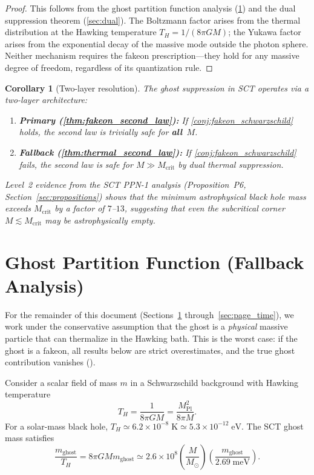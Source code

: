\documentclass[11pt,a4paper]{article}
\newcommand{\MPl}{M_{\mathrm{Pl}}}
\newcommand{\Msun}{M_{\odot}}
\newcommand{\Mcrit}{M_{\mathrm{crit}}}
\newcommand{\mghost}{m_{\mathrm{ghost}}}
\newcommand{\Thr}{T_{\!\scriptscriptstyle H}}
\theoremstyle{plain}
\newtheorem{corollary}[theorem]{Corollary}
\theoremstyle{definition}
\begin{document}
\begin{proof}
  This follows from the ghost partition function analysis
  (\cref{sec:partition}) and the dual suppression theorem
  (\cref{sec:dual}).  The Boltzmann factor arises from the thermal
  distribution at the Hawking temperature $\Thr = 1/(8\pi G M)$;
  the Yukawa factor arises from the exponential decay of the massive
  mode outside the photon sphere.  Neither mechanism requires the
  fakeon prescription---they hold for any massive degree of freedom,
  regardless of its quantization rule.
\end{proof}

\begin{corollary}[Two-layer resolution]%
\label{cor:two_layer}
  The ghost suppression in SCT operates via a two-layer architecture:
  \begin{enumerate}[label=\textup{(\alph*)}]
    \item \textbf{Primary (\cref{thm:fakeon_second_law}):}
      If \cref{conj:fakeon_schwarzschild} holds, the second law is
      trivially safe for \textbf{all}~$M$.
    \item \textbf{Fallback (\cref{thm:thermal_second_law}):}
      If \cref{conj:fakeon_schwarzschild} fails, the second law is
      safe for $M \gg \Mcrit$ by dual thermal suppression.
  \end{enumerate}
  Level~2 evidence from the SCT PPN-1 analysis (Proposition~P6,
  Section~\ref{sec:propositions}) shows that the minimum astrophysical
  black hole mass exceeds $\Mcrit$ by a factor of $7$--$13$,
  suggesting that even the subcritical corner $M \lesssim \Mcrit$
  may be astrophysically empty.
\end{corollary}


\section{Ghost Partition Function (Fallback Analysis)}%
\label{sec:partition}

For the remainder of this document (Sections~\ref{sec:partition}
through~\ref{sec:page_time}), we work under the conservative
assumption that the ghost is a \emph{physical} massive particle
that can thermalize in the Hawking bath.  This is the worst case: if
the ghost is a fakeon, all results below are strict overestimates, and
the true ghost contribution vanishes ().

Consider a scalar field of mass $m$ in a Schwarzschild background with
Hawking temperature
\begin{equation}\label{eq:TH}
  \Thr = \frac{1}{8\pi G M} = \frac{\MPl^2}{8\pi M}.
\end{equation}
For a solar-mass black hole,
$\Thr \simeq 6.2\times 10^{-8}\;\mathrm{K}
  \simeq 5.3\times 10^{-12}\;\mathrm{eV}$.
The SCT ghost mass satisfies
\begin{equation}\label{eq:mT_ratio}
  \frac{\mghost}{\Thr} = 8\pi G M \mghost
  \simeq 2.6\times 10^{8}
  \left(\frac{M}{\Msun}\right)
  \left(\frac{\mghost}{2.69\;\mathrm{meV}}\right).
\end{equation}
\end{document}
